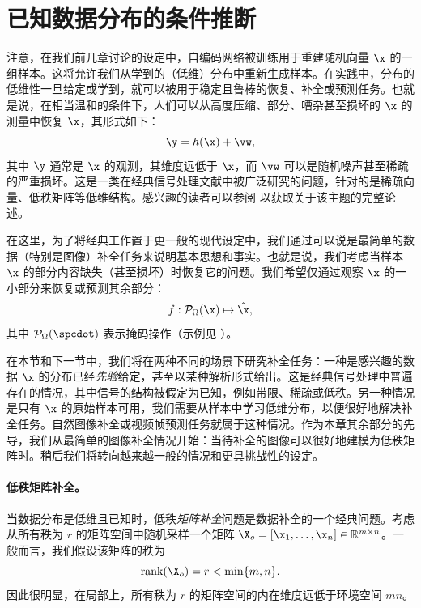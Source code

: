 \documentclass[../../book-main_zh.tex]{subfiles}
\begin{document}
\section{已知数据分布的条件推断}
注意，在我们前几章讨论的设定中，自编码网络被训练用于重建随机向量 $\x$ 的一组样本。这将允许我们从学到的（低维）分布中重新生成样本。在实践中，分布的低维性一旦给定或学到，就可以被用于稳定且鲁棒的恢复、补全或预测任务。也就是说，在相当温和的条件下，人们可以从高度压缩、部分、嘈杂甚至损坏的 $\x$ 的测量中恢复 $\x$，其形式如下：
\begin{equation}
    \y = h(\x) + \vw,
\end{equation}
其中 $\y$ 通常是 $\x$ 的观测，其维度远低于 $\x$，而 $\vw$ 可以是随机噪声甚至稀疏的严重损坏。这是一类在经典信号处理文献中被广泛研究的问题，针对的是稀疏向量、低秩矩阵等低维结构。感兴趣的读者可以参阅 \cite{Wright-Ma-2022} 以获取关于该主题的完整论述。

在这里，为了将经典工作置于更一般的现代设定中，我们通过可以说是最简单的数据（特别是图像）补全任务来说明基本思想和事实。也就是说，我们考虑当样本 $\x$ 的部分内容缺失（甚至损坏）时恢复它的问题。我们希望仅通过观察 $\x$ 的一小部分来恢复或预测其余部分：
\begin{equation}
    f: \mathcal{P}_{\Omega}(\x) \mapsto \hat{\x},
\end{equation}
其中 $\mathcal{P}_{\Omega}(\spcdot)$ 表示掩码操作（示例见 ）。

在本节和下一节中，我们将在两种不同的场景下研究补全任务：一种是感兴趣的数据 $\x$ 的分布已经{\em 先验}给定，甚至以某种解析形式给出。这是经典信号处理中普遍存在的情况，其中信号的结构被假定为已知，例如带限、稀疏或低秩。另一种情况是只有 $\x$ 的原始样本可用，我们需要从样本中学习低维分布，以便很好地解决补全任务。自然图像补全或视频帧预测任务就属于这种情况。作为本章其余部分的先导，我们从最简单的图像补全情况开始：当待补全的图像可以很好地建模为低秩矩阵时。稍后我们将转向越来越一般的情况和更具挑战性的设定。

\paragraph{低秩矩阵补全。}
当数据分布是低维且已知时，低秩{\em 矩阵补全}问题是数据补全的一个经典问题。考虑从所有秩为 $r$ 的矩阵空间中随机采样一个矩阵 $\X_o =
[\x_1, \ldots, \x_n] \in \mathbb{R}^{m\times n}$。一般而言，我们假设该矩阵的秩为
\begin{equation}
    \mbox{rank}(\X_o) = r < \min\{m, n\}.
\end{equation}
因此很明显，在局部上，所有秩为 $r$ 的矩阵空间的内在维度远低于环境空间 $mn$。
\end{document}
